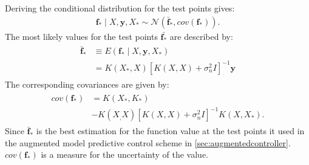 Deriving the conditional distribution for the test points gives:
\begin{align}
\mathbf{f_*} \mid X,\mathbf{y},X_* \sim \mathcal{N}(\bar{\mathbf{f}}_*,cov(\mathbf{f_*})).
\end{align}
The most likely values for the test points $\bar{\mathbf{f_*}}$ are described by:
\begin{align}
\begin{split}
\bar{\mathbf{f}}_* &\equiv E(\mathbf{f_*} \mid X,\mathbf{y},X_*)\\
                   &= K(X_*,X)[K(X,X)+\sigma_n^2I]^{-1}\mathbf{y}
\end{split}
\end{align}
The corresponding covariances are given by:
\begin{align}
\begin{split}
cov(\mathbf{f_*}) &= K(X_*,K_*)\\
                  &-K(X_,X)[K(X,X)+\sigma_n^2I]^{-1}K(X,X_*).
\end{split}
\end{align}
Since $\bar{\mathbf{f}}_*$ is the best estimation for the function value at the test points it used in the augmented model predictive control scheme in \cref{sec:augmentedcontroller}.
$cov(\mathbf{f_*})$ is a measure for the uncertainty of the value.


